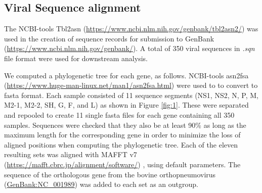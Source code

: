 \documentclass{article}
\begin{document}
\subsection{Viral Sequence alignment}
The NCBI-tools Tbl2asn (\url{https://www.ncbi.nlm.nih.gov/genbank/tbl2asn2/})
was used in the creation of sequence records for submission to GenBank (\url{https://www.ncbi.nlm.nih.gov/genbank/}).
A total of 350 viral sequences in \textit{.sqn} file format were used for downstream analysis.

We computed a phylogenetic tree for each gene, as follows.
NCBI-tools asn2fsa (\url{https://www.huge-man-linux.net/man1/asn2fsa.html}) were used to to convert to fasta format.
Each sample consisted of 11 sequence segments
(NS1, NS2, N, P, M, M2-1, M2-2, SH, G, F, and L) as shown in 
Figure \ref{fig:1}.
These were separated and repooled to create 11 single fasta files for each gene containing all 350 samples. 
Sequences were checked that they also be at least 90\% as long as the maximum length 
for the corresponding gene in order to minimize the loss of aligned positions when computing the phylogenetic tree. 
Each of the eleven resulting sets was aligned with MAFFT v7 (\url{https://mafft.cbrc.jp/alignment/software/})
\cite{katoh2013mafft},
using default  parameters.
The sequence of the orthologous gene from the bovine orthopneumovirus 
(\href{https://www.ncbi.nlm.nih.gov/nuccore/NC_001989}{GenBank:NC\_001989}) 
was added to each set as an outgroup. 
\end{document}
